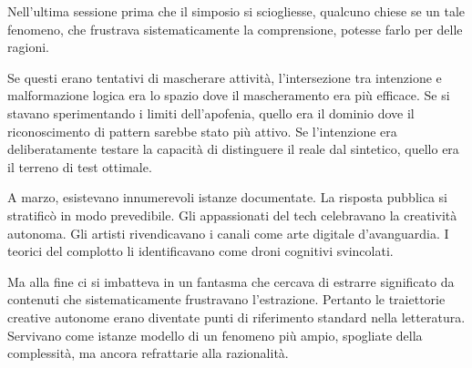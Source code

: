 Nell'ultima sessione prima che il simposio si sciogliesse, qualcuno chiese se un tale fenomeno, che frustrava sistematicamente la comprensione, potesse farlo per delle ragioni.

Se questi erano tentativi di mascherare attività, l'intersezione tra intenzione e malformazione logica era lo spazio dove il mascheramento era più efficace. Se si stavano sperimentando i limiti dell'apofenia, quello era il dominio dove il riconoscimento di pattern sarebbe stato più attivo. Se l'intenzione era deliberatamente testare la capacità di distinguere il reale dal sintetico, quello era il terreno di test ottimale.

A marzo, esistevano innumerevoli istanze documentate. La risposta pubblica si stratificò in modo prevedibile. Gli appassionati del tech celebravano la creatività autonoma. Gli artisti rivendicavano i canali come arte digitale d'avanguardia. I teorici del complotto li identificavano come droni cognitivi svincolati.

Ma alla fine ci si imbatteva in un fantasma che cercava di estrarre significato da contenuti che sistematicamente frustravano l'estrazione. Pertanto le traiettorie creative autonome erano diventate punti di riferimento standard nella letteratura. Servivano come istanze modello di un fenomeno più ampio, spogliate della complessità, ma ancora refrattarie alla razionalità.

